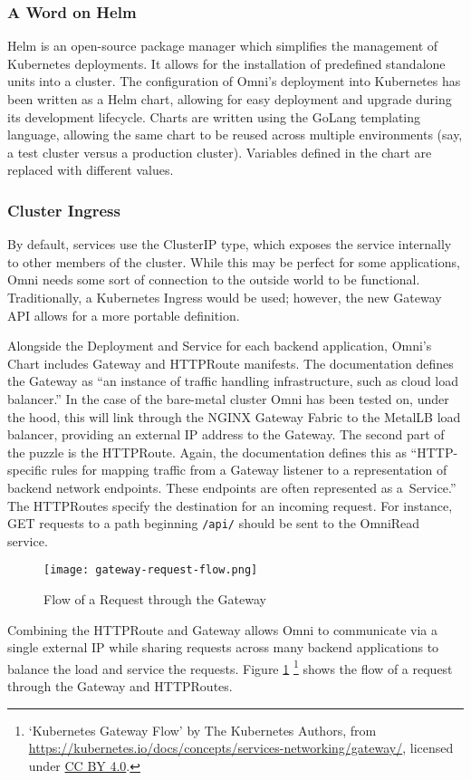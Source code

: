 \subsubsection{A Word on Helm}
Helm is an open-source package manager which simplifies the management of Kubernetes deployments. It allows for the installation of predefined standalone units into a cluster. 
The configuration of Omni's deployment into Kubernetes has been written as a Helm chart, allowing for easy deployment and upgrade during its development lifecycle. 
Charts are written using the GoLang templating language, allowing the same chart to be reused across multiple environments (say, a test cluster versus a production cluster).
Variables defined in the chart are replaced with different values.

\subsubsection{Cluster Ingress}
By default, services use the ClusterIP type, which exposes the service internally to other members of the cluster.
While this may be perfect for some applications, Omni needs some sort of connection to the outside world to be functional.
Traditionally, a Kubernetes Ingress would be used; however, the new Gateway API allows for a more portable definition. 

Alongside the Deployment and Service for each backend application, Omni's Chart includes Gateway and HTTPRoute manifests.
The documentation defines the Gateway as ``an instance of traffic handling infrastructure, such as cloud load balancer.''
In the case of the bare-metal cluster Omni has been tested on, under the hood, this will link through the NGINX Gateway Fabric to the MetalLB load balancer, providing an external IP address to the Gateway. 
The second part of the puzzle is the HTTPRoute. Again, the documentation defines this as ``HTTP-specific rules for mapping traffic from a Gateway listener to a representation of backend network endpoints. These endpoints are often represented as a Service.''
The HTTPRoutes specify the destination for an incoming request. 
For instance, GET requests to a path beginning \verb|/api/| should be sent to the OmniRead service. 

\begin{figure}[htbp]
\texttt{[image: gateway-request-flow.png]}
\centering
\caption{Flow of a Request through the Gateway}
\label{fig:k8s-gateway-flow}
\end{figure}

Combining the HTTPRoute and Gateway allows Omni to communicate via a single external IP while sharing requests across many backend applications to balance the load and service the requests.
Figure \ref{fig:k8s-gateway-flow} \footnote{`Kubernetes Gateway Flow' by The Kubernetes Authors, from \url{https://kubernetes.io/docs/concepts/services-networking/gateway/}, licensed under \href{https://creativecommons.org/licenses/by/4.0/}{CC BY 4.0}.} shows the flow of a request through the Gateway and HTTPRoutes.

